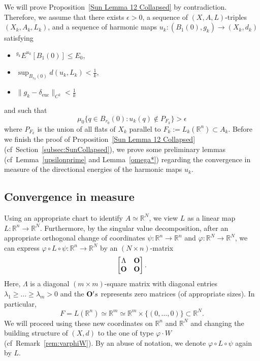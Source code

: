 \documentclass[12pt]{amsart}
\theoremstyle{definition}
\numberwithin{equation}{section}
\newcommand{\R}{\mathbb R}
\newcommand{\deltae}{\delta_{\text{euc}}}
\newcommand{\PFk}{P_{F_k}}
\begin{document}
 We will prove Proposition~\ref{Sun Lemma 12 Collapsed} by contradiction.  Therefore, we  assume that there exists $\epsilon>0$, a sequence of $(X,A,L)$-triples $(X_k, A_k, L_k)$, and a sequence of harmonic maps $u_k:(B_1(0), g_k) \to (X_k, d_k)$ satisfying
\begin{itemize}
\item ${^{g_k}E}^{u_k}[B_1(0)]\leq E_0$, 
\item $\sup_{B_{r_0}(0)} d(u_k,L_k) < \frac{1}{k}$, 
\item $\|g_k-\deltae\|_{C^2}<\frac{1}{k}$
\end{itemize}
and such that 
\begin{equation} \label{geqep}
\mu_0\{q \in B_{r_0}(0):u_k(q) \notin \PFk \} > \epsilon
\end{equation}
where $\PFk$ is the union of all flats of $X_k$ parallel to  $F_k:=L_k(\R^n) \subset A_k$.
Before we finish the proof of Proposition~\ref{Sun Lemma 12 Collapsed} (cf~Section~\ref{subsec:SunCollapsed}), we prove some preliminary lemmas (cf~Lemma~\ref{upsilonprime} and Lemma~\ref{omega*}) regarding the convergence in measure of the   directional energies of the harmonic maps $u_k$.

\subsection{Convergence in measure} \label{subsec:inmeasure}
Using an appropriate chart to identify $A \simeq \R^N$, we view $L$ as a linear map $L:\R^n \to \R^N$.  Furthermore, by the singular value decomposition,   after an appropriate orthogonal change of coordinates $\psi:\R^n \rightarrow \R^n$ and $\varphi:\R^N \rightarrow \R^N$, we can express $\varphi \circ L\circ \psi: \R^n \rightarrow \R^N$ by an  $(N \times n)$-matrix 
\[
\begin{bmatrix}
\Lambda &{\bf O}  \\
{\bf O} & {\bf O}
\end{bmatrix}.
\]
Here,  $\Lambda$ is a  diagonal $(m\times m)$-square matrix with diagonal entries $\lambda_1 \geq \dots \geq  \lambda_m>0$ and the ${\bf O}'s$ represents zero matrices (of appropriate sizes).  In particular, 
\[
F=L(\R^n) \simeq \R^m \simeq \R^m \times \{(0,\dots,0)\} \subset \R^N.
\]
We will proceed using these new coordinates on $\R^n$ and $\R^N$ and changing the building structure of $(X,d)$ to the one of type $\varphi \cdot W$ (cf~Remark~\ref{rem:varphiW}).  By an abuse of notation, we denote $\varphi \circ L\circ \psi$ again by $L$.
\end{document}
